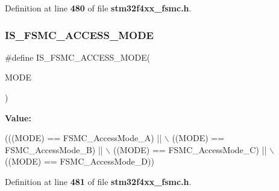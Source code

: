 Definition at line \textbf{ 480} of file \textbf{ stm32f4xx\+\_\+fsmc.\+h}.

\mbox{\label{group__FSMC__Access__Mode_ga1844335f297ea30e9d7fae09ce562092}} 
\subsubsection{I\+S\+\_\+\+F\+S\+M\+C\+\_\+\+A\+C\+C\+E\+S\+S\+\_\+\+M\+O\+DE}
{\footnotesize\ttfamily \#define I\+S\+\_\+\+F\+S\+M\+C\+\_\+\+A\+C\+C\+E\+S\+S\+\_\+\+M\+O\+DE(\begin{DoxyParamCaption}\item[{}]{M\+O\+DE }\end{DoxyParamCaption})}

{\bfseries Value\+:}
\begin{DoxyCode}
(((MODE) == FSMC_AccessMode_A) || \(\backslash\)
                                   ((MODE) == FSMC_AccessMode_B) || \(\backslash\)
                                   ((MODE) == FSMC_AccessMode_C) || \(\backslash\)
                                   ((MODE) == FSMC_AccessMode_D))
\end{DoxyCode}


Definition at line \textbf{ 481} of file \textbf{ stm32f4xx\+\_\+fsmc.\+h}.

